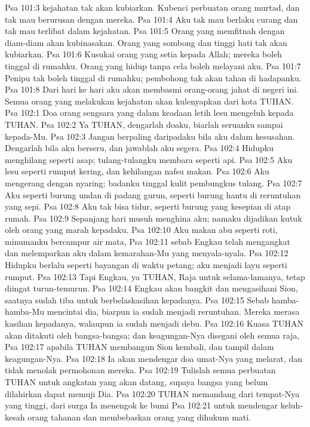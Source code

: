 Psa 101:3  kejahatan tak akan kubiarkan. Kubenci perbuatan orang murtad, dan tak mau berurusan dengan mereka.
Psa 101:4  Aku tak mau berlaku curang dan tak mau terlibat dalam kejahatan.
Psa 101:5  Orang yang memfitnah dengan diam-diam akan kubinasakan. Orang yang sombong dan tinggi hati tak akan kubiarkan.
Psa 101:6  Kusukai orang yang setia kepada Allah; mereka boleh tinggal di rumahku. Orang yang hidup tanpa cela boleh melayani aku.
Psa 101:7  Penipu tak boleh tinggal di rumahku; pembohong tak akan tahan di hadapanku.
Psa 101:8  Dari hari ke hari aku akan membasmi orang-orang jahat di negeri ini. Semua orang yang melakukan kejahatan akan kulenyapkan dari kota TUHAN.
Psa 102:1  Doa orang sengsara yang dalam keadaan letih lesu mengeluh kepada TUHAN.
Psa 102:2  Ya TUHAN, dengarlah doaku, biarlah seruanku sampai kepada-Mu.
Psa 102:3  Jangan berpaling daripadaku bila aku dalam kesusahan. Dengarlah bila aku berseru, dan jawablah aku segera.
Psa 102:4  Hidupku menghilang seperti asap; tulang-tulangku membara seperti api.
Psa 102:5  Aku lesu seperti rumput kering, dan kehilangan nafsu makan.
Psa 102:6  Aku mengerang dengan nyaring; badanku tinggal kulit pembungkus tulang.
Psa 102:7  Aku seperti burung undan di padang gurun, seperti burung hantu di reruntuhan yang sepi.
Psa 102:8  Aku tak bisa tidur, seperti burung yang kesepian di atap rumah.
Psa 102:9  Sepanjang hari musuh menghina aku; namaku dijadikan kutuk oleh orang yang marah kepadaku.
Psa 102:10  Aku makan abu seperti roti, minumanku bercampur air mata,
Psa 102:11  sebab Engkau telah mengangkat dan melemparkan aku dalam kemarahan-Mu yang menyala-nyala.
Psa 102:12  Hidupku berlalu seperti bayangan di waktu petang; aku menjadi layu seperti rumput.
Psa 102:13  Tapi Engkau, ya TUHAN, Raja untuk selama-lamanya, tetap diingat turun-temurun.
Psa 102:14  Engkau akan bangkit dan mengasihani Sion, saatnya sudah tiba untuk berbelaskasihan kepadanya.
Psa 102:15  Sebab hamba-hamba-Mu mencintai dia, biarpun ia sudah menjadi reruntuhan. Mereka merasa kasihan kepadanya, walaupun ia sudah menjadi debu.
Psa 102:16  Kuasa TUHAN akan ditakuti oleh bangsa-bangsa; dan keagungan-Nya disegani oleh semua raja,
Psa 102:17  apabila TUHAN membangun Sion kembali, dan tampil dalam keagungan-Nya.
Psa 102:18  Ia akan mendengar doa umat-Nya yang melarat, dan tidak menolak permohonan mereka.
Psa 102:19  Tulislah semua perbuatan TUHAN untuk angkatan yang akan datang, supaya bangsa yang belum dilahirkan dapat memuji Dia.
Psa 102:20  TUHAN memandang dari tempat-Nya yang tinggi, dari surga Ia menengok ke bumi
Psa 102:21  untuk mendengar keluh-kesah orang tahanan dan membebaskan orang yang dihukum mati.
